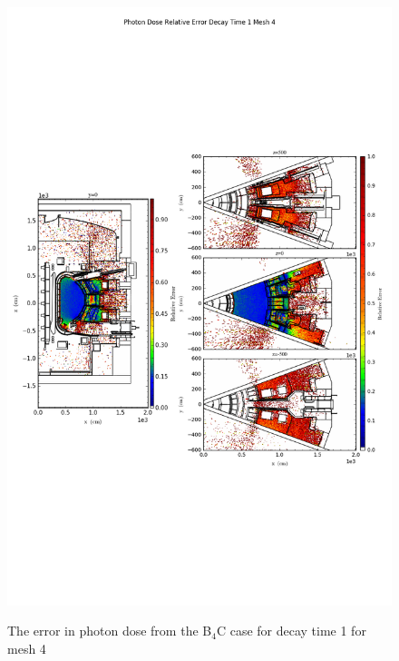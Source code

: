 \begin{figure}[ht!]
\centering
\includegraphics[trim={0cm 9cm 0cm 10cm},clip,scale=0.75]{../plots/final_model_nob4c/Photon_Dose_Relative_Error_Decay_Time_1_Mesh_4.png}
\label{fig:photons_dc1_no4bc_m4_error}
\caption{The error in photon dose from the B$_4$C case for decay time 1 for mesh 4}
\end{figure}

